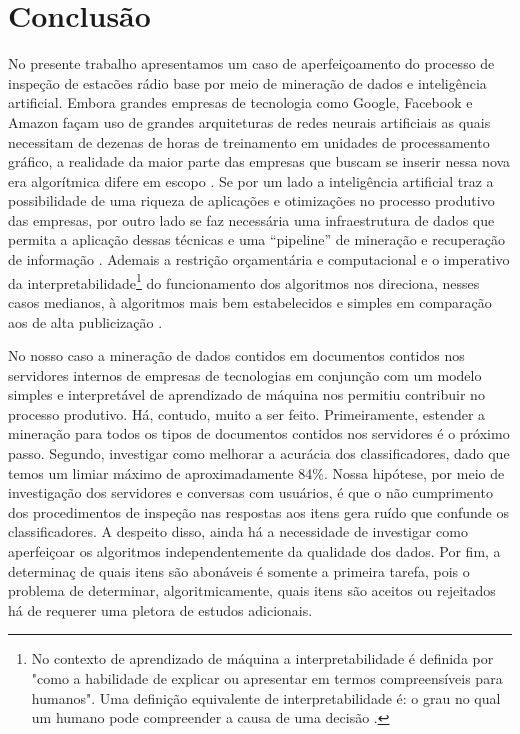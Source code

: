 \documentclass[
	12pt,				%
	openany,			%
	oneside,			%
	a4paper,			%
	english,			%
	french,				%
	spanish,			%
	brazil,				%
	]{abntex2}
\begin{document}
\chapter*[Conclusão]{Conclusão}

No presente trabalho apresentamos um caso de aperfei\c{c}oamento do processo de
inspe\c{c}ão de esta{c}ões rádio base por meio de minera\c{c}ão de dados e
inteligência artificial. Embora grandes empresas de tecnologia como Google,
Facebook e Amazon façam uso de grandes arquiteturas de redes neurais artificiais
as quais necessitam de dezenas de horas de treinamento em unidades de
processamento gráfico, a realidade da maior parte das empresas que buscam se
inserir nessa nova era algorítmica difere em escopo \cite{canziani2016analysis}.
Se por um lado a inteligência artificial traz a possibilidade de uma riqueza de
aplicações e otimizações no processo produtivo das empresas, por outro lado se
faz necessária uma infraestrutura de dados que permita a aplicação dessas
técnicas e uma ``pipeline'' de mineração e recuperação de informação
\cite{schutze2007introduction}. Ademais a restrição orçamentária e computacional
e o imperativo da interpretabilidade\footnote{No contexto de aprendizado de
  máquina a interpretabilidade é definida por 
  "como a habilidade de explicar ou apresentar em termos compreensíveis para
  humanos". Uma definição equivalente de interpretabilidade é: o grau no qual um
  humano pode compreender a causa de uma decisão \cite{miller2018explanation}.}
do funcionamento dos algoritmos nos direciona, nesses casos medianos, à
algoritmos mais bem estabelecidos e simples em comparação aos de alta
publicização \cite{dreiseitl2002logistic}.

No nosso caso a minera\c{c}ão de dados contidos em documentos contidos nos
servidores internos de empresas de tecnologias em conjun\c{c}ão com um modelo
simples e interpretável de aprendizado de máquina nos permitiu contribuir no
processo produtivo. Há, contudo, muito a ser feito. Primeiramente, estender a
minera\c{c}ão para todos os tipos de documentos contidos nos servidores é o
próximo passo. Segundo, investigar como melhorar a acurácia dos classificadores,
dado que temos um limiar máximo de aproximadamente 84\%. Nossa hipótese, por
meio de investiga\c{c}ão dos servidores e conversas com usuários, é que o não
cumprimento dos procedimentos de inspe\c{c}ão nas respostas aos itens gera ruído
que confunde os classificadores. A despeito disso, ainda há a necessidade de
investigar como aperfei\c{c}oar os algoritmos independentemente da qualidade dos
dados. Por fim, a determina\c{c} de quais itens são abonáveis é somente a
primeira tarefa, pois o problema de determinar, algoritmicamente, quais itens
são aceitos ou rejeitados há de requerer uma pletora de estudos adicionais.
\end{document}

